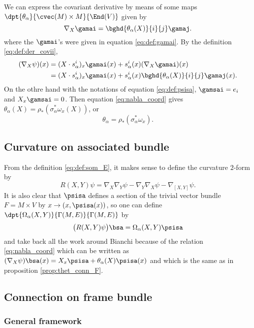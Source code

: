 We can express the covariant derivative by means of some maps $\dpt{\theta_{\alpha}}{\cvec(M)\times M}{\End(V)}$ given by
 \begin{equation}
\nabla_X\gamai=\bghd{\theta_{\alpha}(X)}{i}{j}\gamaj.
 \end{equation}
where the $\gamai$'s were given in equation \eqref{eq:def:gamai}. By the definition \eqref{eq:def:der_covii},
\[
\begin{split}
  (\nabla_X\psi)(x)&=(X\cdot s^i_{\alpha})_x\gamai(x)+s^i_{\alpha}(x)(\nabla_X\gamai)(x)\\
                   &=(X\cdot s^i_{\alpha})_x\gamai(x)+s^i_{\alpha}(x)\bghd{\theta_{\alpha}(X)}{i}{j}\gamaj(x).
\end{split}
\]
On the othre hand with the notations of equation \eqref{eq:def:psisa}, $\gamsai=e_i$ and $X_x\gamsai=0$. Then equation \eqref{eq:nabla_coord} gives $\theta_{\alpha}(X)=\rho_*(\sigma_{\alpha}^*\omega_x(X))$, or
\begin{equation}
\theta_{\alpha}=\rho_*(\sigma^*_{\alpha}\omega_x).
\end{equation}

\subsection{Curvature on associated bundle}

From the definition \eqref{eq:def:som_E}, it makes sense to define the curvature $2$-form by
\[
  R(X,Y)\psi=\nabla_X\nabla_Y\psi-\nabla_Y\nabla_X\psi-\nabla_{[X,Y]}\psi.
\]
It is also clear that $\psisa$ defines a section of the trivial vector bundle $F=M\times V$ by $x\to (x,\psisa(x))$, so one can define  $\dpt{\Omega_{\alpha}(X,Y)}{\Gamma(M,E)}{\Gamma(M,E)}$ by
\[
  \big(  R(X,Y)\psi  \big)\bsa=\Omega_{\alpha}(X,Y)\psisa
\]
and take back all the work around Bianchi because of the relation \eqref{eq:nabla_coord} which can be written as $(\nabla_X\psi)\bsa(x)=X_x\psisa+\theta_{\alpha}(X)\psisa(x)$ and which is the same as in proposition \ref{prop:thet_conn_F}.

\subsection{Connection on frame bundle}

\subsubsection{General framework}

